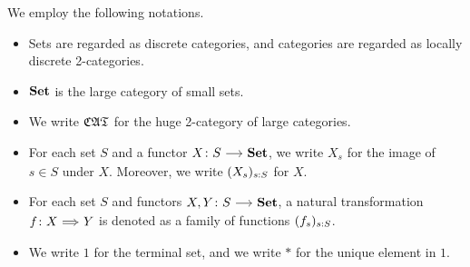 \documentclass[a4paper,dvipsnames, 11pt]{amsart} %
\begin{document}
\maketitle
\begin{notation}
	We employ the following notations.
	\begin{itemize}
		\item %
			Sets are regarded as discrete categories,
			and categories are regarded as locally discrete 2-categories.
		\item %
			$\mathbf{Set}$ is the large category of small sets.
		\item %
			We write ${\mathfrak{CAT}}$ for the huge 2-category of large categories.
		\item %
			For each set $S$ and a functor $X\colon S\arr\Set$,
			we write $X_s$ for the image of $s\in S$ under $X$.
			Moreover, we write $(X_s)_{s: S}$ for $X$.
		\item %
			For each set $S$ and functors $X,Y\colon S\arr \Set$,
			a natural transformation $f\colon X \arr[Rightarrow]Y$ is denoted as a family of functions
			$(f_s)_{s: S}$.
		\item %
			We write $1$ for the terminal set, and we write $*$ for the unique element in $1$.
	\end{itemize}
\end{notation}
\end{document}
